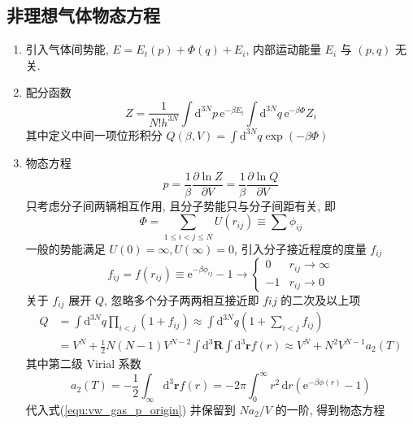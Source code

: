 \documentclass[12pt,a4paper]{article}%
\numberwithin{equation}{section}
\renewcommand*{\vec}[1]{\bm{#1}}%
\newcommand{\dif}{\mathrm{d}}
\newcommand{\diff}{\,\mathrm{d}}
\newcommand\e{\mathrm{e}}%
\begin{document}
\subsection{非理想气体物态方程} %
\label{sub:non-ideal_gas}
\begin{enumerate}
    \item 引入气体间势能, $E = E_t(p) + \Phi(q) + E_i$, 内部运动能量 $E_i$ 与 $(p,q)$ 无关. 
    \item 配分函数
    \begin{equation}
        Z = \frac 1{N!h^{3N}}\int\dif^{3N}p\,\e^{-\beta E_t}
        \int\dif^{3N}q\,\e^{-\beta\Phi}Z_i
    \end{equation}
    其中定义中间一项位形积分 $Q(\beta,V) = \int\dif^{3N}q\exp(-\beta\Phi)$
    \item 物态方程
    \begin{equation}\label{equ:vw_gas_p_origin}
        p = \frac 1\beta\frac{\partial\ln Z}{\partial V} 
        = \frac 1\beta\frac{\partial\ln Q}{\partial V}
    \end{equation}
    只考虑分子间两辆相互作用, 且分子势能只与分子间距有关, 即
    \begin{equation}
        \Phi = \sum_{1\le i< j\le N}U(r_{ij}) \equiv \sum \phi_{ij}
    \end{equation}
    一般的势能满足 $U(0) = \infty, U(\infty) = 0$, 
    引入分子接近程度的度量 $f_{ij}$
    \begin{equation}
        f_{ij} =f(r_{ij})\equiv \e^{-\beta\phi_{ij}}-1 
        \to \begin{cases}
            0     &r_{ij}\to\infty \\
            -1    &r_{ij}\to 0
        \end{cases}
    \end{equation}
    关于 $f_{ij}$ 展开 $Q$, 忽略多个分子两两相互接近即 $f{ij}$ 的二次及以上项
    \begin{align}
        Q &= \int\dif^{3N}q\prod_{i<j}(1+f_{ij}) \approx 
        \int\dif^{3N}q\left(1+\sum_{i<j}f_{ij}\right)\nonumber\\
        &= V^N + \frac 12 N(N-1)V^{N-2}\int\dif^3\vec R\int\dif^3\vec r f(r) 
        \approx V^N + N^2V^{N-1}a_2(T)
    \end{align}
    其中第二级 Virial 系数
    \begin{equation}
        a_2(T) = -\frac 12\int_\infty\dif^3\vec r f(r) 
        = -2\pi\int_0^\infty r^2\diff r\left(\e^{-\beta\phi(r)}-1\right)
    \end{equation}
    代入式(\ref{equ:vw_gas_p_origin}) 并保留到 $Na_2/V$ 的一阶, 得到物态方程

\end{enumerate}
\end{document}
